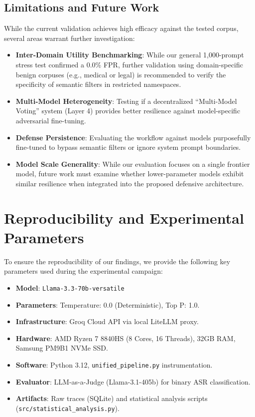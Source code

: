 \documentclass[conference]{IEEEtran}
\begin{document}
\subsection{Limitations and Future Work}
While the current validation achieves high efficacy against the tested corpus, several areas warrant further investigation:
\begin{itemize}
    \item \textbf{Inter-Domain Utility Benchmarking}: While our general 1,000-prompt stress test confirmed a 0.0\% FPR, further validation using domain-specific benign corpuses (e.g., medical or legal) is recommended to verify the specificity of semantic filters in restricted namespaces.
    \item \textbf{Multi-Model Heterogeneity}: Testing if a decentralized ``Multi-Model Voting'' system (Layer 4) provides better resilience against model-specific adversarial fine-tuning.
    \item \textbf{Defense Persistence}: Evaluating the workflow against models purposefully fine-tuned to bypass semantic filters or ignore system prompt boundaries.
    \item \textbf{Model Scale Generality}: While our evaluation focuses on a single frontier model, future work must examine whether lower-parameter models exhibit similar resilience when integrated into the proposed defensive architecture.
\end{itemize}

\section{Reproducibility and Experimental Parameters}
To ensure the reproducibility of our findings, we provide the following key parameters used during the experimental campaign:
\begin{itemize}
    \item \textbf{Model}: \texttt{Llama-3.3-70b-versatile}
    \item \textbf{Parameters}: Temperature: 0.0 (Deterministic), Top P: 1.0.
    \item \textbf{Infrastructure}: Groq Cloud API via local LiteLLM proxy.
    \item \textbf{Hardware}: AMD Ryzen 7 8840HS (8 Cores, 16 Threads), 32GB RAM, Samsung PM9B1 NVMe SSD.
    \item \textbf{Software}: Python 3.12, \texttt{unified\_pipeline.py} instrumentation.
    \item \textbf{Evaluator}: LLM-as-a-Judge (Llama-3.1-405b) for binary ASR classification.
    \item \textbf{Artifacts}: Raw traces (SQLite) and statistical analysis scripts (\texttt{src/statistical\_analysis.py}).
\end{itemize}
\end{document}
